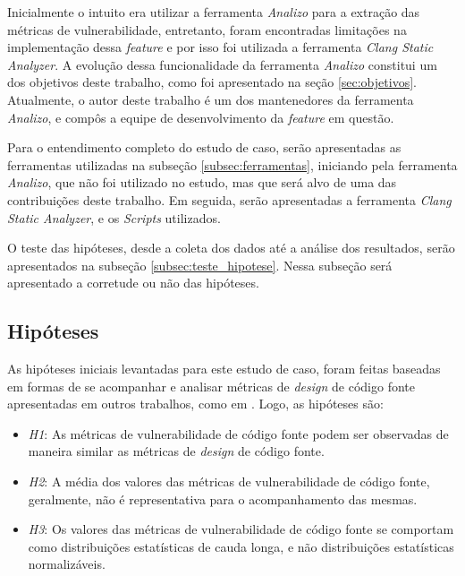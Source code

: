 Inicialmente o intuito era utilizar a ferramenta \emph{Analizo} para a extração
das métricas de vulnerabilidade, entretanto, foram encontradas limitações na
implementação dessa \textit{feature} e por isso foi utilizada a ferramenta
\emph{Clang Static Analyzer}. A evolução dessa funcionalidade da ferramenta
\emph{Analizo} constitui um dos objetivos deste trabalho, como foi apresentado na seção
\ref{sec:objetivos}. Atualmente, o autor deste trabalho é um dos mantenedores da
ferramenta \emph{Analizo}, e compôs a equipe de desenvolvimento da
\textit{feature} em questão.

Para o entendimento completo do estudo de caso, serão apresentadas as
ferramentas utilizadas na subseção \ref{subsec:ferramentas}, iniciando pela ferramenta \emph{Analizo}, que
não foi utilizado no estudo, mas que será alvo de uma das contribuições deste
trabalho. Em seguida, serão apresentadas a ferramenta \emph{Clang Static
Analyzer}, e os \textit{Scripts} utilizados.

O teste das hipóteses, desde a coleta dos dados até a análise dos resultados, serão
apresentados na subseção \ref{subsec:teste_hipotese}. Nessa subseção será
apresentado a corretude ou não das hipóteses.

\subsection{Hipóteses} \label{subsec:hipoteses}

As hipóteses iniciais levantadas para este estudo de caso, foram feitas baseadas em
formas de se acompanhar e analisar métricas de \textit{design} de código fonte
apresentadas em outros trabalhos, como em . Logo, as hipóteses são:

\begin{itemize}
  \item \textit{H1}: As métricas de vulnerabilidade de código fonte podem ser
    observadas de maneira similar as métricas de \textit{design} de código
    fonte.
  \item \textit{H2}: A média dos valores das métricas de vulnerabilidade de
    código fonte, geralmente, não é representativa para o acompanhamento das mesmas.
  \item \textit{H3}: Os valores das métricas de vulnerabilidade de código fonte
    se comportam como distribuições estatísticas de cauda longa, e não
    distribuições estatísticas normalizáveis.
\end{itemize}

